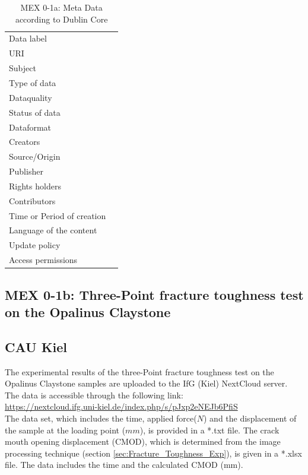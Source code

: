 \begin{table}[h!]
\caption{MEX 0-1a: Meta Data according to Dublin Core}
\label{tab:}
\small
\begin{tabular}{R{3cm}|L{7cm}}
\hline
%
Data label &  \\
URI &  \\
Subject  &  \\
Type of data  &  \\
Dataquality  &  \\
Status of data  &  \\
Dataformat  & \\
Creators  &  \\
Source/Origin &  \\
Publisher  &  \\
Rights holders &  \\
Contributors &  \\
Time or Period of creation &  \\
Language of the content &  \\
Update policy &  \\
Access permissions &  \\
%
\hline
\end{tabular}
\end{table}

\subsection{MEX 0-1b: Three-Point fracture toughness test on the Opalinus Claystone}

\subsection*{CAU Kiel}

The experimental results of the three-Point fracture toughness test on the Opalinus Claystone samples are uploaded to the IfG (Kiel) NextCloud server. The data is accessible through the following link:\\
\hyperlink{https://nextcloud.ifg.uni-kiel.de/index.php/s/pJxp2eNEJb6PfiS}{https://nextcloud.ifg.uni-kiel.de/index.php/s/pJxp2eNEJb6PfiS}\\

The data set, which includes the time, applied force($N$) and the displacement of the sample at the loading point ($mm$), is provided in a *.txt file. The crack mouth opening displacement (CMOD), which is determined from the image processing technique (section \ref {sec:Fracture_Toughness_Exp}), is given in a *.xlsx file. The data includes the time and the calculated CMOD (mm). 

